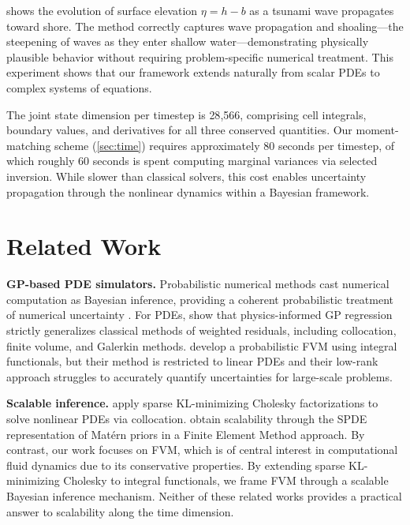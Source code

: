\documentclass{article}
\theoremstyle{plain}
\theoremstyle{definition}
\theoremstyle{remark}
\begin{document}
 shows the evolution of surface elevation $\eta = h - b$ as a tsunami wave propagates toward shore.
The method correctly captures wave propagation and shoaling---the steepening of waves as they enter shallow water---demonstrating physically plausible behavior without requiring problem-specific numerical treatment.
This experiment shows that our framework extends naturally from scalar PDEs to complex systems of equations.

The joint state dimension per timestep is 28{,}566, comprising cell integrals, boundary values, and derivatives for all three conserved quantities.
Our moment-matching scheme (\cref{sec:time}) requires approximately 80 seconds per timestep, of which roughly 60 seconds is spent computing marginal variances via selected inversion.
While slower than classical solvers, this cost enables uncertainty propagation through the nonlinear dynamics within a Bayesian framework.

\section{Related Work}
\label{sec:related-work}

\textbf{GP-based PDE simulators.}
Probabilistic numerical methods cast numerical computation as Bayesian inference, providing a coherent probabilistic treatment of numerical uncertainty \citep{cockayneBayesianProbabilisticNumerical2019b}.
For PDEs, \citet{pfortnerPhysicsInformedGaussianProcess2024} show that physics-informed GP regression strictly generalizes classical methods of weighted residuals, including collocation, finite volume, and Galerkin methods.
\citet{weilandScalingProbabilisticPDE2024} develop a probabilistic FVM using integral functionals, but their method is restricted to linear PDEs and their low-rank approach struggles to accurately quantify uncertainties for large-scale problems.

\textbf{Scalable inference.}
\citet{chenSparseCholeskyFactorization2025} apply sparse KL-minimizing Cholesky factorizations to solve nonlinear PDEs via collocation.
\citet{weilandFlexibleEfficientProbabilistic2025a} obtain scalability through the SPDE representation of Mat\'ern priors in a Finite Element Method approach.
By contrast, our work focuses on FVM, which is of central interest in computational fluid dynamics due to its conservative properties.
By extending sparse KL-minimizing Cholesky to integral functionals, we frame FVM through a scalable Bayesian inference mechanism.
Neither of these related works provides a practical answer to scalability along the time dimension.
\end{document}
